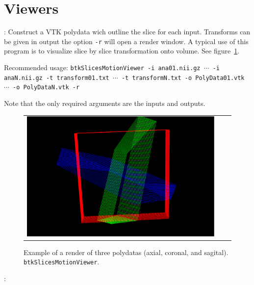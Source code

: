 \newpage
\section{Viewers}
\label{sec:viewers}

\begin{description}
\item[btkSlicesMotionViewer]: Construct a VTK polydata wich outline the slice for each input. Transforms can be given in output the option \texttt{-r} will open a render window.
A typical use of this program is to visualize slice by slice transformation onto volume. See figure~\ref{fig:btkSlicesMotionViewer}.

Recommended usage: \texttt{btkSlicesMotionViewer -i ana01.nii.gz $\cdots$ -i anaN.nii.gz -t transform01.txt $\cdots$ -t transformN.txt -o PolyData01.vtk $\cdots$ -o PolyDataN.vtk -r }

Note that the only required arguments are the inputs and outputs.

\begin{figure}[t]
\centering
\begin{tabular}{ccc}
\includegraphics[width=0.5\columnwidth]{btkSlicesMotionViewer.eps}
\end{tabular}
\caption{Example of a render of three polydatas (axial, coronal, and sagital).
\texttt{btkSlicesMotionViewer}.}
\label{fig:btkSlicesMotionViewer}
\end{figure}

\item[btkViewer]:

\end{description}

